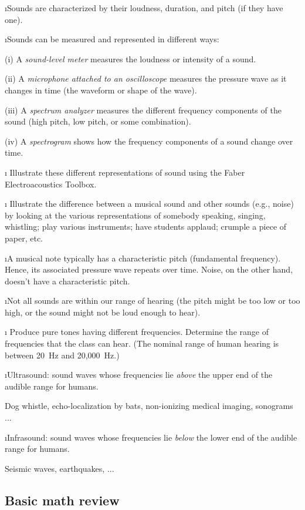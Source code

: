 \i Sounds are characterized by their loudness, 
duration, and pitch (if they have one).

\i Sounds can be measured and represented in
different ways:

(i) A {\em sound-level meter} measures the loudness or
intensity of a sound.

(ii) A {\em microphone attached to an oscilloscope} 
measures the pressure wave as
it changes in time (the waveform or shape of the wave).

(iii) A {\em spectrum analyzer} measures the different 
frequency components of the sound (high pitch, low pitch, 
or some combination).

(iv) A {\em spectrogram} shows how the frequency 
components of a sound change over time.

\i \demo 
Illustrate these different representations of sound using 
the Faber Electroacoustics Toolbox.

\i \demo
Illustrate the difference between a musical sound and
other sounds (e.g., noise) by looking at the various
representations of somebody speaking, singing, whistling;
play various instruments; have students applaud; crumple
a piece of paper, etc.

\i A musical note typically has a characteristic pitch
(fundamental frequency).
Hence, its associated pressure wave repeats over time.
Noise, on the other hand, doesn't have a characteristic pitch.

\i Not all sounds are within our range of hearing 
(the pitch might be too low or too high, or the 
sound might not be loud enough to hear).

\i \demo
Produce pure tones having different frequencies. 
Determine the range of frequencies that the class can
hear.
(The nominal range of human hearing is between 20~Hz and 
20,000~Hz.)

\i Ultrasound: sound waves whose frequencies lie {\em above}
the upper end of the audible range for humans.

\ex Dog whistle, echo-localization by bats,
non-ionizing medical imaging, sonograms ...

\i Infrasound: sound waves whose frequencies lie {\em below}
the lower end of the audible range for humans.

\ex Seismic waves, earthquakes, ...

\ei
\subsection{Basic math review}

